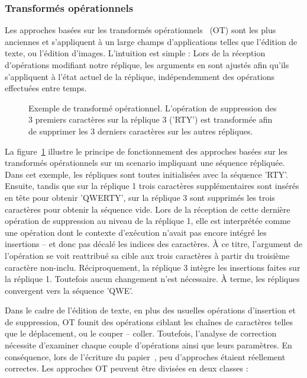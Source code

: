 \subsubsection{Transformés opérationnels}
\label{repl:subsubsec:ot}

Les approches basées sur les transformés opérationnels~\cite{sun1998operational,
  sun2009contextbased} (OT) sont les plus anciennes et s'appliquent à un large
champs d'applications telles que l'édition de texte, ou l'édition
d'images. L'intuition est simple : Lors de la réception d'opérations modifiant
notre réplique, les arguments en sont ajustés afin qu'ils s'appliquent à l'état
actuel de la réplique, indépendemment des opérations effectuées entre temps.

\begin{figure}
  \centering
  
  \caption{\label{repl:fig:otexample} Exemple de transformé
    opérationnel. L'opération de suppression des 3 premiers caractères sur la
    réplique 3 ('RTY') est transformée afin de supprimer les 3 derniers caractères
    sur les autres répliques.}
\end{figure}

La figure~\ref{repl:fig:otexample} illustre le principe de fonctionnement des
approches basées sur les transformés opérationnels sur un scenario impliquant
une séquence répliquée. Dans cet exemple, les répliques sont toutes initialisées
avec la séquence 'RTY'. Ensuite, tandis que sur la réplique 1 trois caractères
supplémentaires sont insérés en tête pour obtenir 'QWERTY', sur la réplique 3
sont supprimés les trois caractères pour obtenir la séquence vide. Lors de la
réception de cette dernière opération de suppression au niveau de la réplique 1,
elle est interprétée comme une opération dont le contexte d'exécution n'avait
pas encore intégré les insertions -- et donc pas décalé les indices des
caractères. À ce titre, l'argument de l'opération se voit reattribué sa cible
aux trois caractères à partir du troisième caractère non-inclu. Réciproquement,
la réplique 3 intègre les insertions faites sur la réplique 1. Toutefois aucun
changement n'est nécessaire. À terme, les répliques convergent vers la séquence
'QWE'.

Dans le cadre de l'édition de texte, en plus des usuelles opérations d'insertion
et de suppression, OT founit des opérations ciblant les chaînes de caractères
telles que le déplacement, ou le couper -- coller. Toutefois, l'analyse de
correction nécessite d'examiner chaque couple d'opérations ainsi que leurs
paramètres. En conséquence, lors de l'écriture du
papier~\cite{imine2003proving}, peu d'approches étaient réellement correctes.
Les approches OT peuvent être divisées en deux classes :

